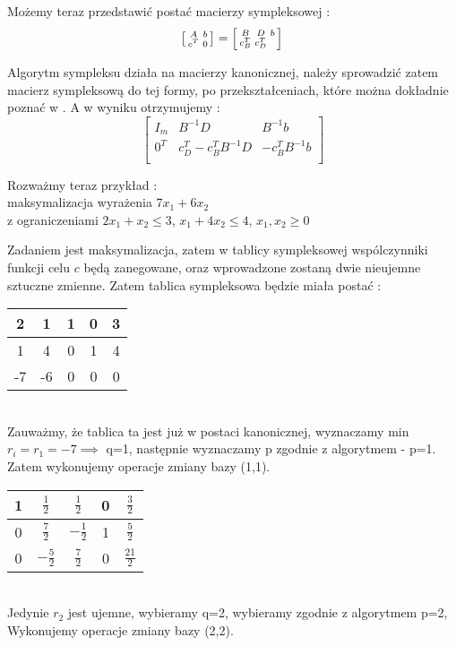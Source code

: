 \documentclass{classrep}
\begin{document}
Możemy teraz przedstawić postać macierzy sympleksowej :
\begin{equation}
\left[ \begin{smallmatrix} A & b \\ c^{T} & 0  \end{smallmatrix} \right] =
\left[ \begin{smallmatrix} B &  D & b \\c^{T}_{B} & c^{T}_{D} \end{smallmatrix} \right]  \\
\end{equation}

Algorytm sympleksu działa na macierzy kanonicznej, należy sprowadzić zatem macierz sympleksową do tej formy, po przekształceniach, które można dokładnie poznać w  \cite{1}. A w wyniku otrzymujemy :
\begin{equation}
	\begin{bmatrix}
		I_m & B^{-1} D & B^{-1} b \\
		0^{T} & c^{T}_{D} - c^{T}_{B} B^{-1} D & -c^{T} _{B} B^{-1} b   \\
	\end{bmatrix}
\end{equation}

Rozważmy teraz przykład :\\
maksymalizacja wyrażenia $7x_1 + 6x_2$\\
z ograniczeniami $2x_1 + x_2 \leq 3$, $x_1 + 4x_2 \leq 4$, $x_1,x_2\geq 0$

Zadaniem jest maksymalizacja, zatem w tablicy sympleksowej wspólczynniki funkcji celu $c$ będą zanegowane, oraz wprowadzone zostaną dwie nieujemne sztuczne zmienne. Zatem tablica sympleksowa będzie miała postać :\\
\begin{tabular}{|c|c|c|c|c|}
\hline 
2 & 1 & 1 & 0 & 3 \\ 
\hline 
1 & 4 & 0 & 1 & 4 \\ 
\hline 
-7 & -6 & 0 & 0 & 0 \\ 
\hline 
\end{tabular} 
\\
Zauważmy, że tablica ta jest już w postaci kanonicznej, wyznaczamy min $r_i = r_1 = -7 \implies$ q=1, następnie wyznaczamy p zgodnie z algorytmem - p=1. Zatem wykonujemy operacje zmiany bazy (1,1). \\
\begin{tabular}{|c|c|c|c|c|}
\hline 
1 & $\frac{1}{2}$ & $\frac{1}{2}$ & 0 & $\frac{3}{2}$ \\ 
\hline 
0 & $\frac{7}{2}$ & $-\frac{1}{2}$ & 1 & $\frac{5}{2}$ \\ 
\hline 
0 & $-\frac{5}{2}$ & $\frac{7}{2}$ & 0 & $\frac{21}{2}$ \\ 
\hline 
\end{tabular} 
\\
Jedynie $r_2$ jest ujemne, wybieramy q=2, wybieramy zgodnie z algorytmem p=2, Wykonujemy operacje zmiany bazy (2,2).\\
\end{document}
